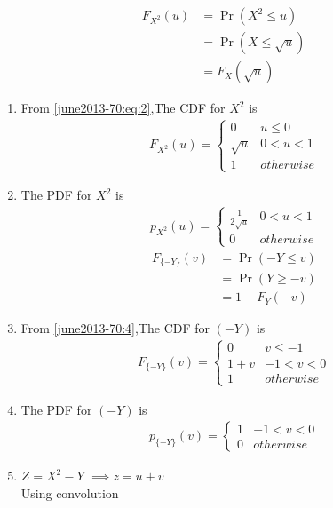 \begin{enumerate}
\begin{enumerate}
\begin{align}
F_{X^2}(u)&=\Pr(X^2 \leq u) \\
          &=\Pr(X \leq \sqrt{u}) \\
          &=F_X(\sqrt{u}) \label{june2013-70:8}
\end{align}
\begin{enumerate}
\item From \eqref{june2013-70:eq:2},The CDF for $X^2$ is
\begin{align}
F_{X^2}(u)  = 
\begin{cases}
      0 & u \leq 0 \\
      \sqrt{u} & 0 < u < 1 \\
      1 & otherwise
\end{cases} \label{june2013-70:9}
\end{align}
\item The PDF for $X^2$ is
\begin{align}
p_{X^2}(u)  = 
\begin{cases}
      \frac{1}{2\sqrt{u}} & 0 < u < 1 \\
      0 & otherwise
\end{cases} \label{june2013-70:10}
\end{align}
\begin{align}
F_{\{-Y\}}(v)&=\Pr(-Y \leq v) \\
          &=\Pr(Y \geq -v) \\
          &=1-F_Y(-v) \label{june2013-70:11}
\end{align}
\item From \eqref{june2013-70:4},The CDF for $(-Y)$ is
\begin{align}
F_{\{-Y\}}(v)  = 
\begin{cases}
      0 & v \leq -1\\
      1+v & -1 < v < 0 \\
      1 & otherwise 
\end{cases}\label{june2013-70:12}
\end{align}
\item The PDF for $(-Y)$ is
\begin{align}
p_{\{-Y\}}(v)  = 
\begin{cases}
      1 & -1 < v < 0 \\
      0 & otherwise
\end{cases} \label{june2013-70:p-y}
\end{align}
\item $Z=X^2-Y$ $\implies  z=u+v$\\
Using convolution

\end{enumerate}
\end{enumerate}
\end{enumerate}
